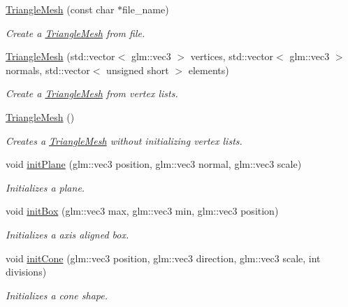 \begin{DoxyCompactItemize}
\item 
\hyperlink{class_triangle_mesh_aba32bb5138081c3903510ecb8573ee22}{Triangle\-Mesh} (const char $\ast$file\-\_\-name)
\begin{DoxyCompactList}\small\item\em Create a \hyperlink{class_triangle_mesh}{Triangle\-Mesh} from file. \end{DoxyCompactList}\item 
\hyperlink{class_triangle_mesh_a309dc6017e3eccac68ff193fc961c29e}{Triangle\-Mesh} (std\-::vector$<$ glm\-::vec3 $>$ vertices, std\-::vector$<$ glm\-::vec3 $>$ normals, std\-::vector$<$ unsigned short $>$ elements)
\begin{DoxyCompactList}\small\item\em Create a \hyperlink{class_triangle_mesh}{Triangle\-Mesh} from vertex lists. \end{DoxyCompactList}\item 
\hyperlink{class_triangle_mesh_a424ee41b5f60d433130c66aae11c8679}{Triangle\-Mesh} ()
\begin{DoxyCompactList}\small\item\em Creates a \hyperlink{class_triangle_mesh}{Triangle\-Mesh} without initializing vertex lists. \end{DoxyCompactList}\item 
void \hyperlink{class_triangle_mesh_a224c1ef04d6ef81e75910f017b0a601c}{init\-Plane} (glm\-::vec3 position, glm\-::vec3 normal, glm\-::vec3 scale)
\begin{DoxyCompactList}\small\item\em Initializes a plane. \end{DoxyCompactList}\item 
void \hyperlink{class_triangle_mesh_a3a4f220dc0d38d0afb5a6bb06fed542a}{init\-Box} (glm\-::vec3 max, glm\-::vec3 min, glm\-::vec3 position)
\begin{DoxyCompactList}\small\item\em Initializes a axis aligned box. \end{DoxyCompactList}\item 
void \hyperlink{class_triangle_mesh_aa793e05b63668163ff112070f065fb7a}{init\-Cone} (glm\-::vec3 position, glm\-::vec3 direction, glm\-::vec3 scale, int divisions)
\begin{DoxyCompactList}\small\item\em Initializes a cone shape. \end{DoxyCompactList}\item 

\end{DoxyCompactItemize}
